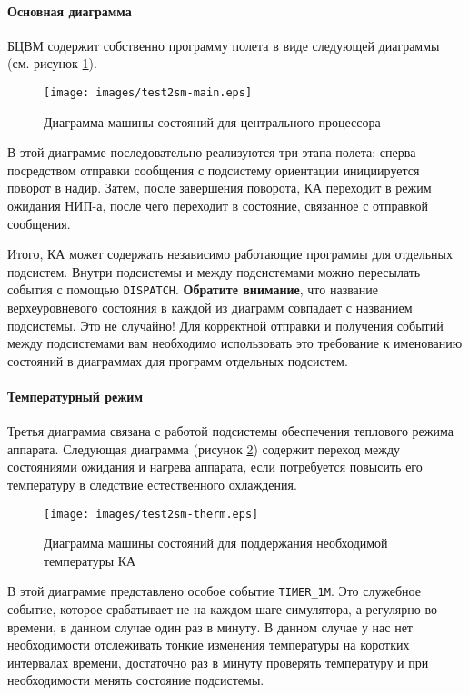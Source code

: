 \documentclass[12pt,a4paper]{article}
\begin{document}
\paragraph{Основная диаграмма} БЦВМ содержит собственно программу полета в виде следующей
диаграммы (см. рисунок \ref{Pic:Test2SM-Main}).

\begin{figure}[tbh]
  \begin{center}
    \texttt{[image: images/test2sm-main.eps]}
    \caption{Диаграмма машины состояний для центрального процессора}
    \label{Pic:Test2SM-Main}
  \end{center}
\end{figure}

В этой диаграмме последовательно реализуются три этапа полета: сперва посредством отправки
сообщения с подсистему ориентации инициируется поворот в надир. Затем, после завершения
поворота, КА переходит в режим ожидания НИП-а, после чего переходит в состояние, связанное
с отправкой сообщения.

Итого, КА может содержать независимо работающие программы для отдельных подсистем. Внутри
подсистемы и между подсистемами можно пересылать события с помощью
\verb'DISPATCH'. \textbf{Обратите внимание}, что название верхеуровневого состояния в
каждой из диаграмм совпадает с названием подсистемы. Это не случайно! Для корректной
отправки и получения событий между подсистемами вам необходимо использовать это требование
к именованию состояний в диаграммах для программ отдельных подсистем.

\paragraph{Температурный режим} Третья диаграмма связана с работой подсистемы обеспечения
теплового режима аппарата. Следующая диаграмма (рисунок \ref{Pic:Test2SM-Therm}) содержит
переход между состояниями ожидания и нагрева аппарата, если потребуется повысить его
температуру в следствие естественного охлаждения.

\begin{figure}[tbh]
  \begin{center}
    \texttt{[image: images/test2sm-therm.eps]}
    \caption{Диаграмма машины состояний для поддержания необходимой температуры КА}
    \label{Pic:Test2SM-Therm}
  \end{center}
\end{figure}

В этой диаграмме представлено особое событие \verb'TIMER_1M'. Это служебное событие,
которое срабатывает не на каждом шаге симулятора, а регулярно во времени, в данном случае
один раз в минуту. В данном случае у нас нет необходимости отслеживать тонкие изменения
температуры на коротких интервалах времени, достаточно раз в минуту проверять температуру
и при необходимости менять состояние подсистемы.
\end{document}
